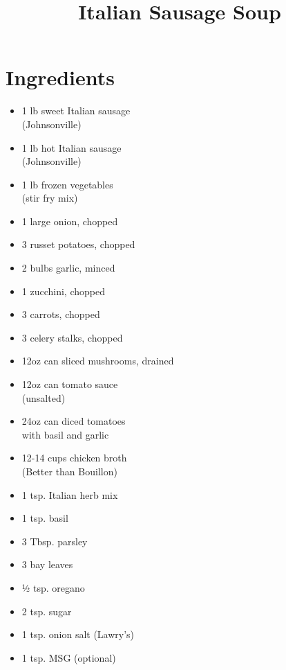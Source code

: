 \documentclass[11pt,letterpaper]{article}
\title{Italian Sausage Soup}
\date{}
\author{}
\begin{document}
\maketitle

\section*{Ingredients}
\begin{multicols}{2}
    \begin{itemize}
        \item 1 lb sweet Italian sausage \\ (Johnsonville)
        \item 1 lb hot Italian sausage \\ (Johnsonville)
        \item 1 lb frozen vegetables \\ (stir fry mix)
        \item 1 large onion, chopped
        \item 3 russet potatoes, chopped
	\item 2 bulbs garlic, minced
	\item 1 zucchini, chopped
	\item 3 carrots, chopped
	\item 3 celery stalks, chopped
	\item 12oz can sliced mushrooms, drained
    \end{itemize}
    \columnbreak
    \begin{itemize}
        \item 12oz can tomato sauce \\ (unsalted)
        \item 24oz can diced tomatoes \\ with basil and garlic
        \item 12-14 cups chicken broth \\ (Better than Bouillon)
	\item 1 tsp. Italian herb mix
        \item 1 tsp. basil
        \item 3 Tbsp. parsley
        \item 3 bay leaves
        \item ½ tsp. oregano
        \item 2 tsp. sugar
	\item 1 tsp. onion salt (Lawry's)
        \item 1 tsp. MSG (optional)
    \end{itemize}
\end{multicols}
\end{document}
